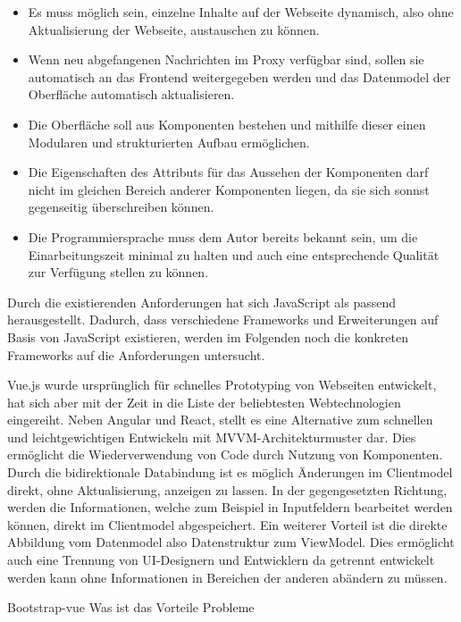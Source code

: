     \begin{itemize}
        \item Es muss möglich sein, einzelne Inhalte auf der Webseite dynamisch, also ohne Aktualisierung der Webseite, austauschen zu können.
        \item Wenn neu abgefangenen Nachrichten im Proxy verfügbar sind, sollen sie automatisch an das Frontend weitergegeben werden und das Datenmodel der Oberfläche automatisch aktualisieren.
        \item Die Oberfläche soll aus Komponenten bestehen und mithilfe dieser einen Modularen und strukturierten Aufbau ermöglichen.
        \item Die Eigenschaften des Attributs für das Aussehen der Komponenten darf nicht im gleichen Bereich anderer Komponenten liegen, da sie sich sonnst gegenseitig überschreiben können.
        \item Die Programmiersprache muss dem Autor bereits bekannt sein, um die Einarbeitungszeit minimal zu halten und auch eine entsprechende Qualität zur Verfügung stellen zu können.
    \end{itemize}
    
    Durch die existierenden Anforderungen hat sich JavaScript als passend herausgestellt. Dadurch, dass verschiedene Frameworks und Erweiterungen auf Basis von JavaScript existieren, werden im Folgenden noch die konkreten Frameworks auf die Anforderungen untersucht.
    
    Vue.js \cite{you2018vue} wurde ursprünglich für schnelles Prototyping von Webseiten entwickelt, hat sich aber mit der Zeit in die Liste der beliebtesten Webtechnologien eingereiht. Neben Angular und React, stellt es eine Alternative zum schnellen und leichtgewichtigen Entwickeln mit \ac{MVVM}-Architekturmuster dar. Dies ermöglicht die Wiederverwendung von Code durch Nutzung von Komponenten. Durch die bidirektionale Databindung ist es möglich Änderungen im Clientmodel direkt, ohne Aktualisierung, anzeigen zu lassen. In der gegengesetzten Richtung, werden die Informationen, welche zum Beispiel in Inputfeldern bearbeitet werden können, direkt im Clientmodel abgespeichert. Ein weiterer Vorteil ist die direkte Abbildung vom Datenmodel also Datenstruktur zum ViewModel. Dies ermöglicht auch eine Trennung von UI-Designern und Entwicklern da getrennt entwickelt werden kann ohne Informationen in Bereichen der anderen abändern zu müssen.
    
    Bootstrap-vue
        Was ist das
        Vorteile
        Probleme